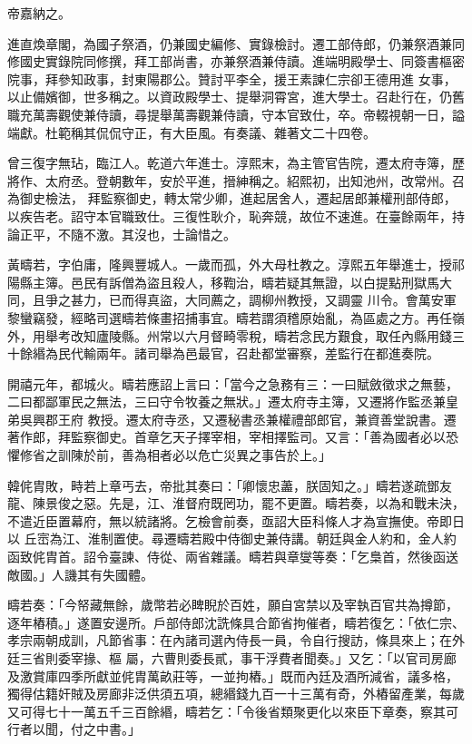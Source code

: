 \begin{pinyinscope}
 帝嘉納之。



 進直煥章閣，為國子祭酒，仍兼國史編修、實錄檢討。遷工部侍郎，仍兼祭酒兼同修國史實錄院同修撰，拜工部尚書，亦兼祭酒兼侍讀。進端明殿學士、同簽書樞密院事，拜參知政事，封東陽郡公。贊討平李全，援王素諫仁宗卻王德用進
 女事，以止備嬪御，世多稱之。以資政殿學士、提舉洞霄宮，進大學士。召赴行在，仍舊職充萬壽觀使兼侍讀，尋提舉萬壽觀兼侍讀，守本官致仕，卒。帝輟視朝一日，謚端獻。杜範稱其侃侃守正，有大臣風。有奏議、雜著文二十四卷。



 曾三復字無玷，臨江人。乾道六年進士。淳熙末，為主管官告院，遷太府寺簿，歷將作、太府丞。登朝數年，安於平進，搢紳稱之。紹熙初，出知池州，改常州。召為御史檢法，
 拜監察御史，轉太常少卿，進起居舍人，遷起居郎兼權刑部侍郎，以疾告老。詔守本官職致仕。三復性耿介，恥奔競，故位不速進。在臺餘兩年，持論正平，不隨不激。其沒也，士論惜之。



 黃疇若，字伯庸，隆興豐城人。一歲而孤，外大母杜教之。淳熙五年舉進士，授祁陽縣主簿。邑民有訴僧為盜且殺人，移鞫治，疇若疑其無證，以白提點刑獄馬大同，且爭之甚力，已而得真盜，大同薦之，調柳州教授，又調靈
 川令。會萬安軍黎蠻竊發，經略司選疇若條畫招捕事宜。疇若謂須稽原始亂，為區處之方。再任嶺外，用舉考改知廬陵縣。州常以六月督畸零稅，疇若念民方艱食，取任內縣用錢三十餘緡為民代輸兩年。諸司舉為邑最官，召赴都堂審察，差監行在都進奏院。



 開禧元年，都城火。疇若應詔上言曰：「當今之急務有三：一曰賦斂徵求之無藝，二曰都鄙軍民之無法，三曰守令牧養之無狀。」遷太府寺主簿，又遷將作監丞兼皇弟吳興郡王府
 教授。遷太府寺丞，又遷秘書丞兼權禮部郎官，兼資善堂說書。遷著作郎，拜監察御史。首章乞天子擇宰相，宰相擇監司。又言：「善為國者必以恐懼修省之訓陳於前，善為相者必以危亡災異之事告於上。」



 韓侂胄敗，畤若上章丐去，帝批其奏曰：「卿懷忠藎，朕固知之。」疇若遂疏鄧友龍、陳景俊之惡。先是，江、淮督府既罔功，罷不更置。疇若奏，以為和戰未決，不遣近臣置幕府，無以統諸將。乞檢會前奏，亟詔大臣科條人才為宣撫使。帝即日以
 丘崈為江、淮制置使。尋遷疇若殿中侍御史兼侍講。朝廷與金人約和，金人約函致侂胄首。詔令臺諫、侍從、兩省雜議。疇若與章燮等奏：「乞梟首，然後函送敵國。」人譏其有失國體。



 疇若奏：「今帑藏無餘，歲幣若必睥睨於百姓，願自宮禁以及宰執百官共為撙節，逐年樁積。」遂置安邊所。戶部侍郎沈詵條具合節省拘催者，疇若復乞：「依仁宗、孝宗兩朝成訓，凡節省事：在內諸司選內侍長一員，令自行搜訪，條具來上；在外廷三省則委宰掾、樞
 屬，六曹則委長貳，事干浮費者聞奏。」又乞：「以官司房廊及激賞庫四季所獻並侂胄萬畝莊等，一並拘樁。」既而內廷及酒所減省，議多格，獨得估籍奸賊及房廊非泛供須五項，總緡錢九百一十三萬有奇，外樁留產業，每歲又可得七十一萬五千三百餘緡，疇若乞：「令後省類聚更化以來臣下章奏，察其可行者以聞，付之中書。」




\end{pinyinscope}

